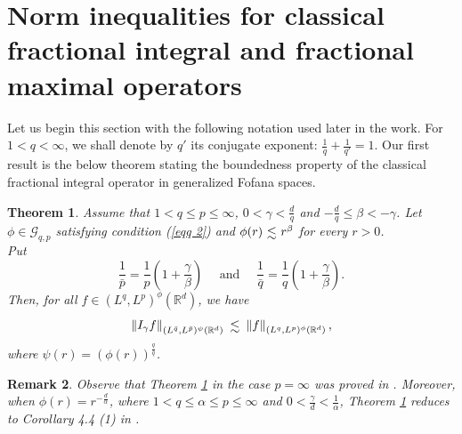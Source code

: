 \documentclass[a4paper,12pt,intlimits,oneside]{amsart}
\numberwithin{equation}{section}
\newtheorem{theorem}{Theorem}[section]
\newtheorem{remark}[theorem]{Remark}
\numberwithin{equation}{section}
\def\lsim{\raisebox{-1ex}{$~\stackrel{\textstyle <}{\sim}~$}}
\theoremstyle{definition}
\begin{document}
\section{Norm inequalities for classical fractional integral and fractional maximal operators}
\label{S3}
Let us begin this section with the following notation used later in the work. For $1<q<\infty$, we shall denote by $q'$ its conjugate exponent: $\frac{1}{q}+\frac{1}{q'}=1$. Our first result is the below theorem stating the boundedness property of the classical fractional integral operator in generalized Fofana spaces.  
\begin{theorem}\label{theo 2}
Assume that $1 < q\leq p \leq \infty$, $ 0 < \gamma < \frac{d}{q}$ and $-\frac{d}{q} \leq \beta  < -\gamma $. Let $\phi\in \mathcal{G}_{q,p}$ satisfying condition (\ref{eqq 2}) and $\phi(r) \lsim  r^{\beta}$ for every $r > 0$. \\ Put $$\frac{1}{\bar{p}} = \frac{1}{p}\left(1 +\frac{\gamma}{\beta}\right) \quad \text{ and } \quad \frac{1}{\bar{q}} = \frac{1}{q}\left(1 +\frac{\gamma}{\beta}\right). $$
 Then, for all  $f \in (L^{q},L^{p})^{\phi}(\mathbb{R}^{d})$, we have
 $$\left\Vert I_{\gamma}f \right\Vert_{(L^{\bar{q}},L^{\bar{p}})^{\psi}(\mathbb{R}^{d})} \lsim  \left\Vert f  \right\Vert_{(L^{q},L^{p})^{\phi}(\mathbb{R}^{d})},$$ where  $\psi(r)= (\phi(r))^{\frac{q}{\bar{q}}}$.
\end{theorem}
\begin{remark}
Observe that Theorem \ref{theo 2} in the case $p=\infty$ was proved in \cite[Theorem 2.2]{GE}. Moreover,
when $\phi (r) = r^{-\frac{d}{\alpha}}$, where $1<q \leq \alpha \leq  p\leq \infty$ and $ 0< \frac{\gamma}{d} < \frac{1}{\alpha}$, Theorem \ref{theo 2} reduces to Corollary 4.4 (1) in \cite{JF}. 
\end{remark}
\end{document}
